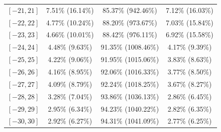 \documentclass[12pt]{article}
\begin{document}
\begin{table}[H]
\begin{tabular}{c|c c c}
$[-21,21]$ & 7.51\% (16.14\%) & 85.37\% (942.46\%) & 7.12\% (16.03\%) \\
$[-22,22]$ & 4.77\% (10.24\%) & 88.20\% (973.67\%) & 7.03\% (15.84\%) \\
$[-23,23]$ & 4.66\% (10.01\%) & 88.42\% (976.11\%) & 6.92\% (15.58\%) \\
$[-24,24]$ & 4.48\% (9.63\%) & 91.35\% (1008.46\%) & 4.17\% (9.39\%) \\
$[-25,25]$ & 4.22\% (9.06\%) & 91.95\% (1015.06\%) & 3.83\% (8.63\%) \\
$[-26,26]$ & 4.16\% (8.95\%) & 92.06\% (1016.33\%) & 3.77\% (8.50\%) \\
$[-27,27]$ & 4.09\% (8.79\%) & 92.24\% (1018.25\%) & 3.67\% (8.27\%) \\
$[-28,28]$ & 3.28\% (7.04\%) & 93.86\% (1036.13\%) & 2.86\% (6.45\%) \\
$[-29,29]$ & 2.95\% (6.34\%) & 94.23\% (1040.22\%) & 2.82\% (6.35\%) \\
$[-30,30]$ & 2.92\% (6.27\%) & 94.31\% (1041.09\%) & 2.77\% (6.25\%) \\
\bottomrule
		\end{tabular}
	\end{table}
\end{document}
